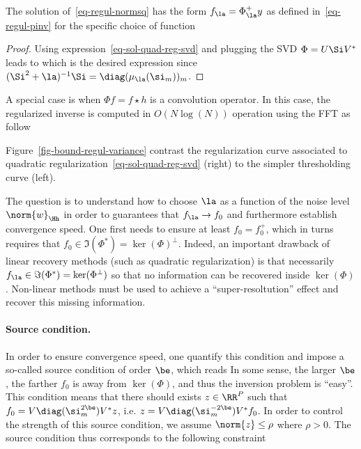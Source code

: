 \begin{prop}\label{prop-var-regul-svd}
	The solution of~\eqref{eq-regul-normsq} has the form $f_\la = \Phi^+_\la y$ as defined in~\eqref{eq-regul-pinv} for the specific choice of function
\end{prop} 
\begin{proof}
Using expression~\eqref{eq-sol-quad-reg-svd} and plugging the SVD $\Phi = U \Si V^*$ leads to
which is the desired expression since $(\Si^2 + \la)^{-1} \Si = \diag(\mu_\la(\si_m))_m$.
\end{proof}

A special case is when $\Phi f = f \star h$ is a convolution operator. In this case, the regularized inverse is computed in $O(N \log(N))$ operation using the FFT as follow

Figure~\ref{fig-bound-regul-variance} contrast the regularization curve associated to quadratic regularization~\eqref{eq-sol-quad-reg-svd} (right) to the simpler thresholding curve (left). 

The question is to understand how to choose $\la$ as a function of the noise level $\norm{w}_\Hh$ in order to guarantees that $f_\la \rightarrow f_0$ and furthermore establish convergence speed. One first needs to ensure at least $f_0=f_0^+$, which in turns requires that $f_0 \in \Im(\Phi^*)=\ker(\Phi)^\bot$. Indeed, an important drawback of linear recovery methods (such as quadratic regularization) is that necessarily $f_\la \in \Im(\Phi^*)=\ker(\Phi^\bot)$ so that no information can be recovered inside $\ker(\Phi)$. Non-linear methods must be used to achieve a ``super-resoltution'' effect and recover this missing information.

\paragraph{Source condition.}

In order to ensure convergence speed, one quantify this condition and impose a so-called source condition of order $\be$, which reads
In some sense, the larger $\be$, the farther $f_0$ is away from $\ker(\Phi)$, and thus the inversion problem is ``easy''. 
This condition means that there should exists $z \in \RR^P$ such that $f_0 = V \diag( \si_m^{2\be} ) V^* z$, i.e. $z =V \diag( \si_m^{-2\be} ) V^* f_0$. In order to control the strength of this source condition, we assume $\norm{z} \leq \rho$ where $\rho>0$. The source condition thus corresponds to the following constraint


